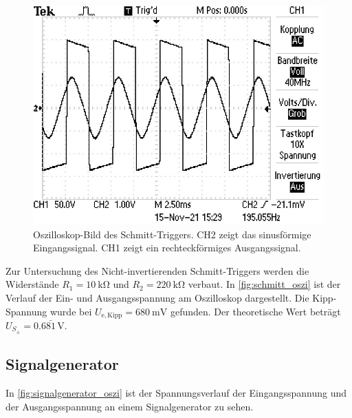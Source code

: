 \begin{figure}[H]
  \centering
  \includegraphics{data/ALL0066/F0066TEK.JPG}
  \caption{Oszilloskop-Bild des Schmitt-Triggers. CH2 zeigt das sinusförmige Eingangssignal. CH1 zeigt ein rechteckförmiges Ausgangssignal.}
  \label{fig:schmitt_oszi}
\end{figure}

Zur Untersuchung des Nicht-invertierenden Schmitt-Triggers werden die Widerstände $R_1 = \SI{10}{\kilo\ohm}$ und $R_2 = \SI{220}{\kilo\ohm}$ verbaut. In \autoref{fig:schmitt_oszi} ist der Verlauf der Ein- und Ausgangsspannung am Oszilloskop dargestellt. Die Kipp-Spannung wurde bei $U_{\mathrm{e, Kipp}} = \SI{680}{\milli\volt}$ gefunden. Der theoretische Wert beträgt $U_{S_{\pm}} = 0.6\bar{81} \, \si{\volt}$.

\newpage
\subsection{Signalgenerator}
In \autoref{fig:signalgenerator_oszi} ist der Spannungsverlauf der Eingangsspannung und der Ausgangsspannung an einem Signalgenerator zu sehen.

